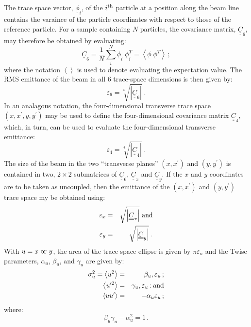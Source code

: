 The trace space vector, $\underline{\phi}_i$, of the $i^{\rm th}$
particle at a position along the beam line contains the varaince of
the particle coordinates with respect to those of the reference
particle.
For a sample containing $N$ particles, the covariance matrix,
$\underline{\underline{C}}_6$, may therefore be obtained by evaluating:
\begin{equation}
  \underline{\underline{C}}_6 = \frac{1}{N} \sum_i^N
                                    \underline{\phi}_i \; \underline{\phi}_i^T
                              = \left<
                                    \underline{\phi} \; \underline{\phi}^T
                                \right> \, ;
  \label{Eq:Cov6}
\end{equation}
where the notation $\left< \right>$ is used to denote evaluating the
expectation value.
The RMS emittance of the beam in all 6 trace-space dimensions is then
given by:
\begin{equation}
  \varepsilon_6 = \sqrt[6]{\left| \underline{\underline{C}}_6 \right| }\;.
\end{equation}
In an analagous notation, the four-dimensional transverse trace space
$(x, x^\prime, y, y^\prime)$ may be used to define the
four-dimensional covariance matrix $\underline{\underline{C}}_4$,
which, in turn, can be used to evaluate the four-dimensional
transverse emittance:
\begin{equation}
  \varepsilon_4 = \sqrt[4]{\left| \underline{\underline{C}}_4 \right| }\;.
\end{equation}
The size of the beam in the two ``transverse planes'' $(x, x^\prime)$
and $(y, y^\prime)$ is contained in two, $2 \times 2$ submatrices of
$\underline{\underline{C}}_6$, $\underline{\underline{C}}_x$ and
$\underline{\underline{C}}_y$.
If the $x$ and $y$ coordinates are to be taken as uncoupled, then the
emittance of the $(x, x^\prime)$ and $(y, y^\prime)$ trace space my
be obtained using:
\begin{eqnarray}
  \varepsilon_x & = & \sqrt     {\left| \underline{\underline{C}}_x \right| }
    {\rm~and} \\
  \varepsilon_y & = & \sqrt{\left| \underline{\underline{C}}_y \right| }\;.
\end{eqnarray}
With $u=x~{\rm or}~y$, the area of the trace space ellipse is given
by $\pi \varepsilon_u$ and the Twise parameters, $\alpha_u$,
$\beta_u$, and $\gamma_u$ are given by:
\begin{eqnarray}
  \sigma_u^2 = \left< u^2 \right> &         = & \beta_u, \varepsilon_u \, ;            \\
  \left< u^{\prime 2} \right> &              = & \gamma_u, \varepsilon_u \, {\rm : and} \\
  \left< u u^\prime \right>   &              = & -\alpha_u \varepsilon_u \, ;
\end{eqnarray}
where:
\begin{equation}
  \beta_u \gamma_u - \alpha_u^2 = 1 \, .
\end{equation}

